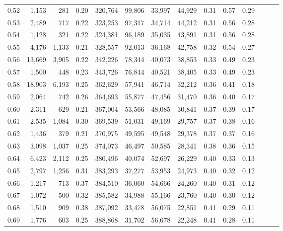 \begin{tabular}{rrrrrrrrrrrrrr}
0.52 &   1,153 &    281 &  0.20 &  320,764 &   99,806 &  33,997 &  44,929 &  0.31 &  0.57 &      0.29 \\
0.53 &   2,489 &    717 &  0.22 &  323,253 &   97,317 &  34,714 &  44,212 &  0.31 &  0.56 &      0.28 \\
0.54 &   1,128 &    321 &  0.22 &  324,381 &   96,189 &  35,035 &  43,891 &  0.31 &  0.56 &      0.28 \\
0.55 &   4,176 &  1,133 &  0.21 &  328,557 &   92,013 &  36,168 &  42,758 &  0.32 &  0.54 &      0.27 \\
0.56 &  13,669 &  3,905 &  0.22 &  342,226 &   78,344 &  40,073 &  38,853 &  0.33 &  0.49 &      0.23 \\
0.57 &   1,500 &    448 &  0.23 &  343,726 &   76,844 &  40,521 &  38,405 &  0.33 &  0.49 &      0.23 \\
0.58 &  18,903 &  6,193 &  0.25 &  362,629 &   57,941 &  46,714 &  32,212 &  0.36 &  0.41 &      0.18 \\
0.59 &   2,064 &    742 &  0.26 &  364,693 &   55,877 &  47,456 &  31,470 &  0.36 &  0.40 &      0.17 \\
0.60 &   2,311 &    629 &  0.21 &  367,004 &   53,566 &  48,085 &  30,841 &  0.37 &  0.39 &      0.17 \\
0.61 &   2,535 &  1,084 &  0.30 &  369,539 &   51,031 &  49,169 &  29,757 &  0.37 &  0.38 &      0.16 \\
0.62 &   1,436 &    379 &  0.21 &  370,975 &   49,595 &  49,548 &  29,378 &  0.37 &  0.37 &      0.16 \\
0.63 &   3,098 &  1,037 &  0.25 &  374,073 &   46,497 &  50,585 &  28,341 &  0.38 &  0.36 &      0.15 \\
0.64 &   6,423 &  2,112 &  0.25 &  380,496 &   40,074 &  52,697 &  26,229 &  0.40 &  0.33 &      0.13 \\
0.65 &   2,797 &  1,256 &  0.31 &  383,293 &   37,277 &  53,953 &  24,973 &  0.40 &  0.32 &      0.12 \\
0.66 &   1,217 &    713 &  0.37 &  384,510 &   36,060 &  54,666 &  24,260 &  0.40 &  0.31 &      0.12 \\
0.67 &   1,072 &    500 &  0.32 &  385,582 &   34,988 &  55,166 &  23,760 &  0.40 &  0.30 &      0.12 \\
0.68 &   1,510 &    909 &  0.38 &  387,092 &   33,478 &  56,075 &  22,851 &  0.41 &  0.29 &      0.11 \\
0.69 &   1,776 &    603 &  0.25 &  388,868 &   31,702 &  56,678 &  22,248 &  0.41 &  0.28 &      0.11 \\

\end{tabular}
